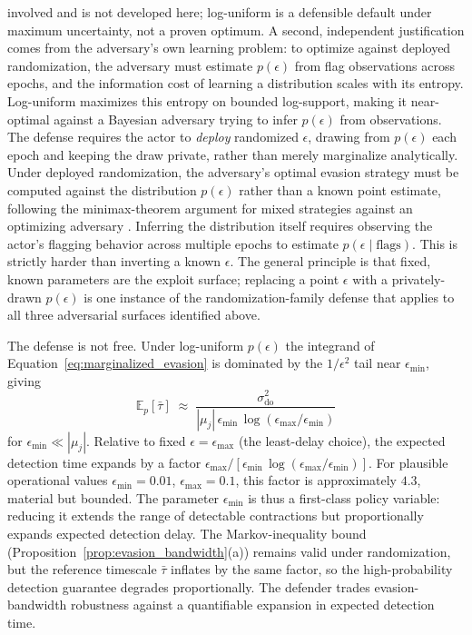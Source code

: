 involved and is not developed here; log-uniform is a defensible
default under maximum uncertainty, not a proven optimum. A second,
independent justification comes from the adversary's own
learning problem: to optimize against deployed randomization,
the adversary must estimate $p(\epsilon)$ from flag observations
across epochs, and the information cost of learning a distribution
scales with its entropy. Log-uniform maximizes this entropy on
bounded log-support, making it near-optimal against a Bayesian
adversary trying to infer $p(\epsilon)$ from observations.
The defense requires the actor to
\emph{deploy} randomized $\epsilon$, drawing from $p(\epsilon)$
each epoch and keeping the draw private, rather than merely
marginalize analytically. Under deployed randomization, the
adversary's optimal evasion strategy must be computed against the
distribution $p(\epsilon)$ rather than a known point estimate,
following the minimax-theorem argument for mixed strategies against
an optimizing adversary \citep{vonneumann1928zur}. Inferring the distribution itself requires observing the actor's
flagging behavior across multiple epochs to estimate
$p(\epsilon \mid \text{flags})$. This is strictly harder than
inverting a known $\epsilon$. The general principle is that fixed,
known parameters are the exploit surface; replacing a point
$\epsilon$ with a privately-drawn $p(\epsilon)$ is one instance of
the randomization-family defense that applies to all three
adversarial surfaces identified above.

The defense is not free. Under log-uniform $p(\epsilon)$ the
integrand of Equation~\eqref{eq:marginalized_evasion} is
dominated by the $1/\epsilon^2$ tail near $\epsilon_{\min}$,
giving
\begin{equation}
\label{eq:randomization_cost}
\mathbb{E}_{p}[\bar{\tau}]
\;\approx\;
\frac{\sigma_{\mathrm{do}}^2}
     {|\mu_j|\,\epsilon_{\min}\,
      \log(\epsilon_{\max}/\epsilon_{\min})}
\end{equation}
for $\epsilon_{\min} \ll |\mu_j|$. Relative to fixed
$\epsilon = \epsilon_{\max}$ (the least-delay choice), the
expected detection time expands by a factor
$\epsilon_{\max}/[\epsilon_{\min}\,
\log(\epsilon_{\max}/\epsilon_{\min})]$. For plausible
operational values $\epsilon_{\min} = 0.01$,
$\epsilon_{\max} = 0.1$, this factor is approximately
$4.3$, material but bounded. The parameter $\epsilon_{\min}$
is thus a first-class policy variable: reducing it extends the
range of detectable contractions but proportionally expands
expected detection delay. The Markov-inequality bound
(Proposition~\ref{prop:evasion_bandwidth}(a)) remains valid
under randomization, but the reference timescale $\bar{\tau}$
inflates by the same factor, so the high-probability detection
guarantee degrades proportionally. The defender trades
evasion-bandwidth robustness against a quantifiable expansion
in expected detection time.

